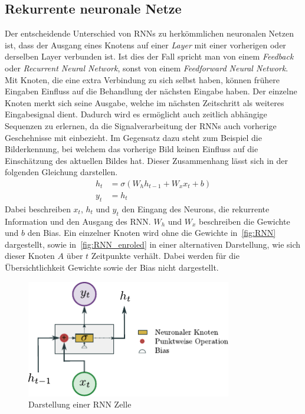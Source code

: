         \subsection{Rekurrente neuronale Netze}\label{sec:RNN}
            Der entscheidende Unterschied von RNNs zu herkömmlichen neuronalen Netzen ist,
            dass der Ausgang eines Knotens auf einer \textit{Layer}  mit einer vorherigen oder derselben Layer verbunden ist.
            Ist dies der Fall spricht man von einem \textit{Feedback} oder \textit{Recurrent Neural Network}, sonst von einem \textit{Feedforward Neural Network}. 
            Mit Knoten, die eine extra Verbindung zu sich selbst haben, können frühere Eingaben Einfluss auf die Behandlung der nächsten Eingabe haben.
            Der einzelne Knoten merkt sich seine Ausgabe, welche im nächsten Zeitschritt als weiteres Eingabesignal dient.
            Dadurch wird es ermöglicht auch zeitlich abhängige Sequenzen zu erlernen, da die Signalverarbeitung der RNNs auch vorherige Geschehnisse mit einbezieht.
            Im Gegensatz dazu steht zum Beispiel die Bilderkennung, bei welchem das vorherige Bild keinen Einfluss auf die Einschätzung des aktuellen Bildes hat.
            Dieser Zusammenhang lässt sich in der folgenden Gleichung darstellen.
            \begin{equation}
                \begin{split}
                    h_t &= \sigma \left(W_{h}h_{t-1} + W_{x}x_{t} + b\right)\\
                    y_t &= h_t
                \end{split}
            \end{equation}
            Dabei beschreiben $x_t$, $h_t$ und $y_t$ den Eingang des Neurons, die rekurrente Information und den Ausgang des RNN\@.
            $W_h$ und  $W_x$ beschreiben die Gewichte und $b$ den Bias.
            Ein einzelner Knoten wird ohne die Gewichte in~\autoref{fig:RNN} dargestellt,
            sowie in~\autoref{fig:RNN_enroled} in einer alternativen Darstellung, wie sich dieser Knoten $A$ über $t$ Zeitpunkte verhält.
            Dabei werden für die Übersichtlichkeit Gewichte sowie der Bias nicht dargestellt.
                \begin{figure}[ht]
                    \centering
                    \includegraphics[width=0.8\textwidth]{images/Illustrationen/RNN_simple}
                    \caption[ass]{Darstellung einer RNN Zelle}
                    \label{fig:RNN}
                \end{figure}
